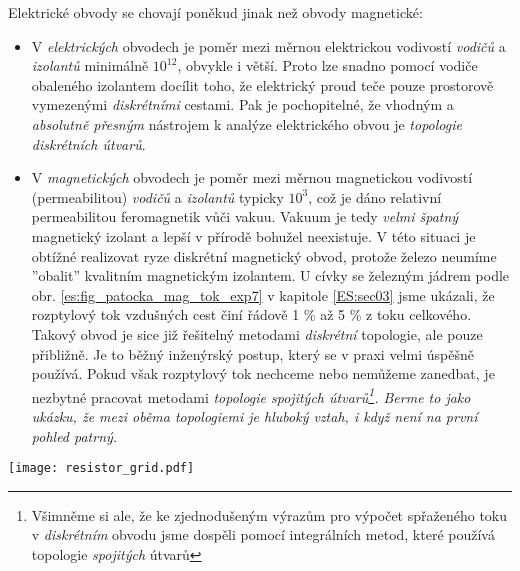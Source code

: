   Elektrické obvody se chovají poněkud jinak než obvody magnetické: 
  \begin{itemize}
    \item V \emph{elektrických} obvodech je poměr mezi měrnou elektrickou vodivostí \emph{vodičů} a
          \emph{izolantů} minimálně $10^{12}$, obvykle i větší. Proto lze snadno pomocí vodiče
          obaleného izolantem docílit toho, že elektrický proud teče pouze prostorově vymezenými
          \emph{diskrétními} cestami. Pak je pochopitelné, že vhodným a \emph{absolutně přesným}
          nástrojem k analýze elektrického obvou je \emph{topologie diskrétních útvarů}.
    \item V \emph{magnetických} obvodech je poměr mezi měrnou magnetickou vodivostí (permeabilitou)
          \emph{vodičů} a \emph{izolantů} typicky $10^{3}$, což je dáno relativní permeabilitou
          feromagnetik vůči vakuu. Vakuum je tedy \emph{velmi špatný} magnetický izolant a lepší v
          přírodě bohužel neexistuje. V této situaci je obtížné realizovat ryze diskrétní magnetický
          obvod, protože železo neumíme ''obalit'' kvalitním magnetickým izolantem. U cívky se
          železným jádrem podle obr. \ref{es:fig_patocka_mag_tok_exp7} v kapitole \ref{ES:sec03} 
          jsme ukázali, že rozptylový tok vzdušných cest činí řádově 1 \% až 5 \% z toku celkového. 
          Takový obvod je sice již řešitelný metodami \emph{diskrétní} topologie, ale pouze 
          přibližně. Je to běžný inženýrský postup, který se v praxi velmi úspěšně používá. Pokud 
          však rozptylový tok nechceme nebo nemůžeme zanedbat, je nezbytné pracovat metodami 
          \emph{topologie spojitých útvarů\footnote{Všimněme si ale, že ke zjednodušeným výrazům 
          pro výpočet spřaženého toku v \emph{diskrétním} obvodu jsme dospěli pomocí integrálních 
          metod, které používá topologie \emph{spojitých} útvarů}. Berme to jako ukázku, že mezi 
          oběma topologiemi je hluboký vztah, i když není na první pohled patrný.}
  \end{itemize} 
%        
   {\centering
    \captionsetup{type=figure}
%    
    \texttt{[image: resistor\_grid.pdf]}
    \label{ES:fig_res_grid}
    \par}       
    \vspace{1em}

